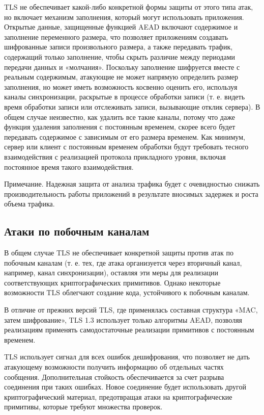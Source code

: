     TLS не обеспечивает какой-либо конкретной формы защиты от этого типа атак, но включает механизм заполнения, который могут использовать приложения. Открытые данные, защищенные функцией AEAD включают содержимое и заполнение переменного размера, что позволяет приложениям создавать шифрованные записи произвольного размера, а также передавать трафик, содержащий только заполнение, чтобы скрыть различие между периодами передачи данных и «молчания». Поскольку заполнение шифруется вместе с реальным содержимым, атакующие не может напрямую определить размер заполнения, но может иметь возможность косвенно оценить его, используя каналы синхронизации, раскрытые в процессе обработки записи (т. е. видеть время обработки записи или отслеживать записи, вызывающие отклик сервера). В общем случае неизвестно, как удалить все такие каналы, потому что даже функция удаления заполнения с постоянным временем, скорее всего будет передавать содержимое с зависимым от его размера временем. Как минимум, сервер или клиент с постоянным временем обработки будут требовать тесного взаимодействия с реализацией протокола прикладного уровня, включая постоянное время такого взаимодействия.
    
    Примечание. Надежная защита от анализа трафика будет с очевидностью снижать производительность работы приложений в результате вносимых задержек и роста объема трафика.
    
    \subsection{Атаки по побочным каналам}
    
    В общем случае TLS не обеспечивает конкретной защиты против атак по побочным каналам (т. е. тех, где атака организуется через вторичный канал, например, канал синхронизации), оставляя эти меры для реализации соответствующих криптографических примитивов. Однако некоторые возможности TLS облегчают создание кода, устойчивого к побочным каналам.
    
    В отличие от прежних версий TLS, где применялась составная структура «MAC, затем шифрование», TLS 1.3 использует только алгоритмы AEAD, позволяя реализациям применять самодостаточные реализации примитивов с постоянным временем.
    
    TLS использует сигнал %
     для всех ошибок дешифрования, что позволяет не дать атакующему возможности получить информацию об отдельных частях сообщения. Дополнительная стойкость обеспечивается за счет разрыва соединения при таких ошибках. Новое соединение будет использовать другой криптографический материал, предотвращая атаки на криптографические примитивы, которые требуют множества проверок.
    
